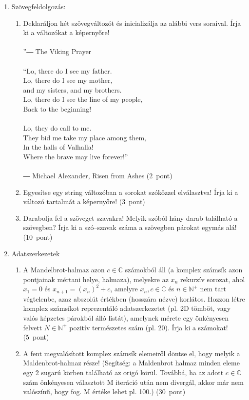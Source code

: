\documentclass[a4paper,12pt]{letter}
\begin{document}
 \begin{enumerate}
 \item Szövegfeldolgozás:
  \begin{enumerate}
   \item Deklaráljon hét szövegváltozót és inicializálja az alábbi vers soraival. Írja ki a változókat a képernyőre! \\ \\''― The Viking Prayer\\ \\“Lo, there do I see my father.\\Lo, there do I see my mother,\\and my sisters, and my brothers.\\Lo, there do I see the line of my people,\\Back to the beginning!\\ \\Lo, they do call to me.\\They bid me take my place among them,\\In the halls of Valhalla!\\Where the brave may live forever!”\\ \\― Michael Alexander, Risen from Ashes \hfill (2~pont)
   \item Egyesítse egy string változóban a sorokat szóközzel elválasztva! Írja ki a változó tartalmát a képernyőre! \hfill (3~pont)
   \item Darabolja fel a szöveget szavakra! Melyik szóból hány darab található a szövegben? Írja ki a szó--szavak száma a szövegben párokat egymás alá! \hfill (10~pont)
   \end{enumerate}
 \item Adatszerkezetek
   \begin{enumerate}
   \item A Mandelbrot-halmaz azon $c \in \mathbb{C}$ számokból áll (a komplex számsík azon pontjainak mértani helye, halmaza), melyekre az $x_{n}$  rekurzív sorozat, ahol $x_{1}=0$ és $x_{n+1}=\left(x_{n}\right)^2+c$,  amelyre $x_{n}, c \in \mathbb{C}$ és $n \in \mathbb{N}^{+}$ nem tart végtelenbe, azaz abszolút értékben (hosszára nézve) korlátos. Hozzon létre komplex számsíkot reprezentáló adatszerkezetet (pl. 2D tömböt, vagy valós képzetes párokból álló listát), amelynek mérete egy önkényesen felvett $N \in \mathbb{N}^{+}$ pozitív természetes szám (pl. 20). Írja ki a számokat! \hfill (5~pont)
     \item A fent megvalósított komplex számsík elemeiről döntse el, hogy melyik a Maldenbrot-halmaz része! (Segítség: a Maldenbrot halmaz minden eleme egy 2 sugarú körben található az origó körül. Továbbá, ha az adott $c\in\mathbb{C}$ szám önkényesen választott M iteráció után nem divergál, akkor már nem valószínű, hogy fog. M értéke lehet pl. 100.) \hfill (30~pont)
   \end{enumerate}
 \end{enumerate}
\end{document}
